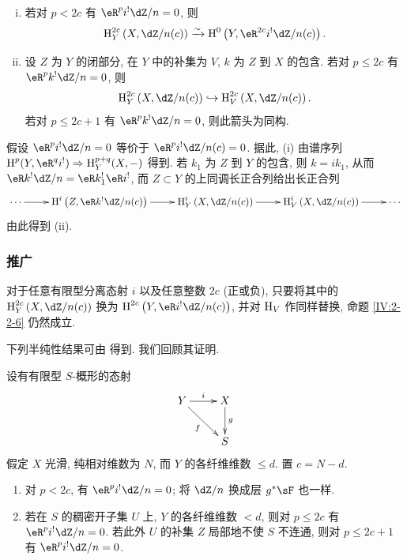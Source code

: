 \begin{proposition}\label{IV:2-2-6}
\begin{enumerate}[(i)]
  \item 若对 $p<2 c$ 有 $\eR^p i^!\dZ/n=0$, 则
    \[
      \h_Y^{2 c}\left(X,\dZ/n(c)\right) \iso \h^0\left(Y,\eR^{2 c} i^! \dZ/n(c)\right) \text{.}
    \]
  \item 设 $Z$ 为 $Y$ 的闭部分, 在 $Y$ 中的补集为 $V$, $k$ 为 $Z$ 到 $X$ 的包含.
    若对 $p\leqslant 2 c$ 有 $\eR^p k^! \dZ/n = 0$, 则
    \[
      \h_Y^{2 c}\left(X,\dZ/n(c)\right) \hookrightarrow \h_V^{2 c}\left(X,\dZ/n(c)\right) \text{.}
    \]
    若对 $p\leqslant 2 c+1$ 有 $\eR^p k^!\dZ/n=0$, 则此箭头为同构.
\end{enumerate}
\end{proposition}

假设 $\eR^p i^!\dZ/n=0$ 等价于 $\eR^p i^!\dZ/n(c)=0$.
据此, (i) 由谱序列 $\h^p(Y,\eR^q i^!)\Rightarrow \h_Y^{p+q}(X,-)$ 得到.
若 $k_1$ 为 $Z$ 到 $Y$ 的包含, 则 $k=i k_1$, 从而
$\eR k^! \dZ/n=\eR k_1^! \eR i^!$,
而 $Z\subset Y$ 的上同调长正合列给出长正合列
\[\xymatrix{
  \cdots \ar[r]
    & \h^i\left(Z,\eR k^! \dZ/n(c)\right) \ar[r]
    & \h_Y^i\left(X,\dZ/n(c)\right) \ar[r]
    & \h_V^i\left(X,\dZ/n(c)\right) \ar[r]
    & \cdots
}\]
由此得到 (ii).

\subsubsection{推广}\label{IV:2-2-7}

对于任意有限型分离态射 $i$ 以及任意整数 $2 c$ (正或负),
只要将其中的 $\h_Y^{2 c}\left(X,\dZ/n(c)\right)$
换为 $\h^{2 c}\left(Y,\eR i^!\dZ/n(c)\right)$,
并对 $\operatorname{H}_V$ 作同样替换, 命题 \ref{IV:2-2-6} 仍然成立.

下列半纯性结果可由 \cite[XIV 1.8, 1.10, 1.15]{sga2} 得到. 我们回顾其证明.

\begin{theorem}\label{IV:2-2-8}
设有有限型 $S$-概形的态射
\[\xymatrix{
  Y \ar[r]^-i \ar[dr]_-f
    & X \ar[d]^-g \\
  & S
}\]
假定 $X$ 光滑, 纯相对维数为 $N$, 而 $Y$ 的各纤维维数 $\leqslant d$. 置 $c=N-d$.
\begin{enumerate}[\indent (i)]
  \item 对 $p<2 c$, 有 $\eR^p i^!\dZ/n=0$;
    将 $\dZ/n$ 换成层 $g^* \sF$ 也一样.
  \item 若在 $S$ 的稠密开子集 $U$ 上, $Y$ 的各纤维维数 $<d$,
    则对 $p\leqslant 2 c$ 有 $\eR^p i^!\dZ/n=0$.
    若此外 $U$ 的补集 $Z$ 局部地不使 $S$ 不连通,
    则对 $p\leqslant 2 c+1$ 有 $\eR^pi^!\dZ/n=0$.
\end{enumerate}
\end{theorem}

